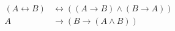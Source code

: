 \documentclass[12pt,BCOR1cm,ngerman,DIV15,fleqn,chapterprefix,headings=small]{ST1-book}
\begin{document}
 \begin{align*}
         (A \leftrightarrow B)     & \leftrightarrow ((A \to B) \land (B \to A) ) \\[1em] %
     A & \to (B \to (A \land B)) \\[1em] %

\end{align*}
\end{document}
